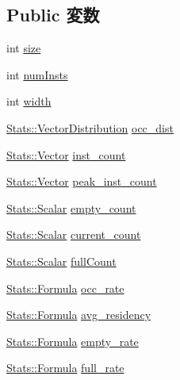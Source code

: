 \subsection*{Public 変数}
\begin{DoxyCompactItemize}
\item 
int \hyperlink{classBackEnd_1_1InstQueue_a439227feff9d7f55384e8780cfc2eb82}{size}
\item 
int \hyperlink{classBackEnd_1_1InstQueue_a358c879c68910efe5300c4515df35b6c}{numInsts}
\item 
int \hyperlink{classBackEnd_1_1InstQueue_a2474a5474cbff19523a51eb1de01cda4}{width}
\item 
\hyperlink{classStats_1_1VectorDistribution}{Stats::VectorDistribution} \hyperlink{classBackEnd_1_1InstQueue_a0a6cfaf987f6b772ffd079ce1bb21c2d}{occ\_\-dist}
\item 
\hyperlink{classStats_1_1Vector}{Stats::Vector} \hyperlink{classBackEnd_1_1InstQueue_aeaded670177c783870c5ddf39c3c6928}{inst\_\-count}
\item 
\hyperlink{classStats_1_1Vector}{Stats::Vector} \hyperlink{classBackEnd_1_1InstQueue_a24f581671815b0aeef8077091ab0a9c0}{peak\_\-inst\_\-count}
\item 
\hyperlink{classStats_1_1Scalar}{Stats::Scalar} \hyperlink{classBackEnd_1_1InstQueue_a42bc77715b0c30a6631cbe20e7e3c9b5}{empty\_\-count}
\item 
\hyperlink{classStats_1_1Scalar}{Stats::Scalar} \hyperlink{classBackEnd_1_1InstQueue_a730156c8124059e3a4a3ad2da1801189}{current\_\-count}
\item 
\hyperlink{classStats_1_1Scalar}{Stats::Scalar} \hyperlink{classBackEnd_1_1InstQueue_a2e155696624248ee21593799d4e4a4a9}{fullCount}
\item 
\hyperlink{classStats_1_1Formula}{Stats::Formula} \hyperlink{classBackEnd_1_1InstQueue_a4172173779f447a5d588417e0273c8a8}{occ\_\-rate}
\item 
\hyperlink{classStats_1_1Formula}{Stats::Formula} \hyperlink{classBackEnd_1_1InstQueue_aeb82d92fe05e8a4cb892ebb445e58dc4}{avg\_\-residency}
\item 
\hyperlink{classStats_1_1Formula}{Stats::Formula} \hyperlink{classBackEnd_1_1InstQueue_ab63a348c8049b1a2a48ff96d6cfa00aa}{empty\_\-rate}
\item 
\hyperlink{classStats_1_1Formula}{Stats::Formula} \hyperlink{classBackEnd_1_1InstQueue_a9635f0670e24507c9817f4809ab299ae}{full\_\-rate}
\end{DoxyCompactItemize}
